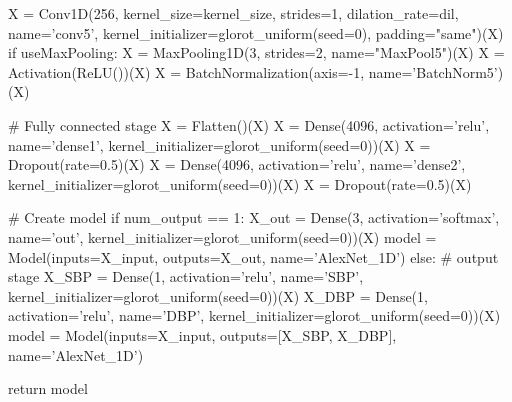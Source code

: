 \begin{python}
        X = Conv1D(256, kernel_size=kernel_size, strides=1, dilation_rate=dil, name='conv5', kernel_initializer=glorot_uniform(seed=0), padding="same")(X)
        if useMaxPooling:
            X = MaxPooling1D(3, strides=2, name="MaxPool5")(X)
        X = Activation(ReLU())(X)
        X = BatchNormalization(axis=-1, name='BatchNorm5')(X)
    
        # Fully connected stage
        X = Flatten()(X)
        X = Dense(4096, activation='relu', name='dense1', kernel_initializer=glorot_uniform(seed=0))(X)
        X = Dropout(rate=0.5)(X)
        X = Dense(4096, activation='relu', name='dense2', kernel_initializer=glorot_uniform(seed=0))(X)
        X = Dropout(rate=0.5)(X)
    
        # Create model
        if num_output == 1:
            X_out = Dense(3, activation='softmax', name='out', kernel_initializer=glorot_uniform(seed=0))(X)
            model = Model(inputs=X_input, outputs=X_out, name='AlexNet_1D')
        else:
            # output stage
            X_SBP = Dense(1, activation='relu', name='SBP', kernel_initializer=glorot_uniform(seed=0))(X)
            X_DBP = Dense(1, activation='relu', name='DBP', kernel_initializer=glorot_uniform(seed=0))(X)
            model = Model(inputs=X_input, outputs=[X_SBP, X_DBP], name='AlexNet_1D')
    
        return model
\end{python}

